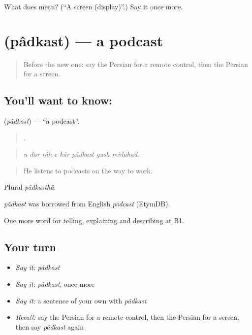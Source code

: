 \begin{tcolorbox}[breakable,colback=teal!4,colframe=teal!35!black,title={Before you move on}]
What does   mean? (\textquotedblleft{}A screen (display)\textquotedblright{}.) Say it once more.
\end{tcolorbox}
\section[\texorpdfstring{\fa{پادکست} (pâdkast)}{پادکست (pâdkast)}]{ (pâdkast) — a podcast}

\label{lesson:FA-C532-padkast}



\begin{quote}
Before the new one: say the Persian for a remote control, then the Persian for a screen.
\end{quote}

\subsection*{You'll want to know: }
\textbf{} (\emph{pâdkast}) — \textquotedblleft{}a podcast\textquotedblright{}.

\begin{quote}
      .
\end{quote}

\begin{quote}
\emph{u dar râh-e kâr pâdkast gush midahad.}
\end{quote}

\begin{quote}
He listens to podcasts on the way to work.
\end{quote}

Plural \emph{pâdkasthâ}.

\begin{cousinweb}
\emph{pâdkast} was borrowed from English \emph{podcast} (EtymDB).
\end{cousinweb}

\begin{grammarlens}[title={What you've built}]
One more word for telling, explaining and describing at B1.
\end{grammarlens}

\subsection*{Your turn}
\begin{itemize}
\raggedright
  \item \emph{Say it:} \emph{pâdkast}
  \item \emph{Say it:} \emph{pâdkast}, once more
  \item \emph{Say it:} a sentence of your own with \emph{pâdkast}
  \item \emph{Recall:} say the Persian for a remote control, then the Persian for a screen, then say \emph{pâdkast} again
\end{itemize}

